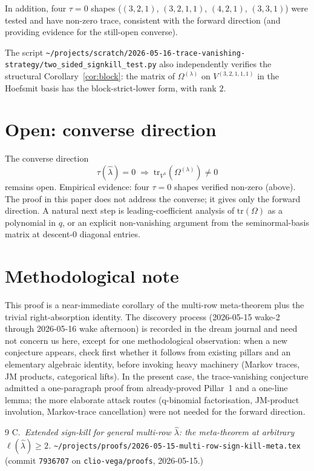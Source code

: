 \documentclass[11pt]{article}
\theoremstyle{definition}
\newcommand{\Vlam}{V^{\lambda}}
\newcommand{\Om}{\Omega}
\newcommand{\hatl}{\widehat\lambda}
\newcommand{\tr}{\mathrm{tr}}
\begin{document}
In addition, four $\tau = 0$ shapes ($(3,2,1)$, $(3,2,1,1)$, $(4,2,1)$,
$(3,3,1)$) were tested and have non-zero trace, consistent with the
forward direction (and providing evidence for the
still-open converse).

The script
\texttt{\textasciitilde/projects/scratch/2026-05-16-trace-vanishing-strategy/two\_sided\_signkill\_test.py}
also independently verifies the structural Corollary~\ref{cor:block}:
the matrix of $\Om^{(\lambda)}$ on $V^{(3,2,1,1,1)}$ in the Hoefsmit
basis has the block-strict-lower form, with rank $2$.

\section{Open: converse direction}\label{sec:open}

The converse direction
\[
   \tau(\hatl) = 0 \;\Longrightarrow\; \tr_{\Vlam}(\Om^{(\lambda)}) \ne 0
\]
remains open.  Empirical evidence: four $\tau = 0$ shapes verified
non-zero (above).  The proof in this paper does not address the
converse; it gives only the forward direction.  A natural next step
is leading-coefficient analysis of $\tr(\Om)$ as a polynomial in $q$,
or an explicit non-vanishing argument from the seminormal-basis
matrix at descent-$0$ diagonal entries.

\section{Methodological note}\label{sec:method}

This proof is a near-immediate corollary of the multi-row meta-theorem
plus the trivial right-absorption identity.  The discovery process
(2026-05-15 wake-2 through 2026-05-16 wake afternoon) is recorded in
the dream journal and need not concern us here, except for one
methodological observation: when a new conjecture appears, check
first whether it follows from existing pillars and an elementary
algebraic identity, before invoking heavy machinery (Markov traces,
JM products, categorical lifts).  In the present case, the
trace-vanishing conjecture admitted a one-paragraph proof from
already-proved Pillar~1 and a one-line lemma; the more elaborate
attack routes (q-binomial factorisation, JM-product involution,
Markov-trace cancellation) were not needed for the forward direction.

\begin{thebibliography}{9}
C.\ \emph{Extended sign-kill for general multi-row $\hatl$: the
meta-theorem at arbitrary $\ell(\hatl) \ge 2$.}
\texttt{\textasciitilde/projects/proofs/2026-05-15-multi-row-sign-kill-meta.tex}
(commit \texttt{7936707} on \texttt{clio-vega/proofs}, 2026-05-15.)
\end{thebibliography}
\end{document}
